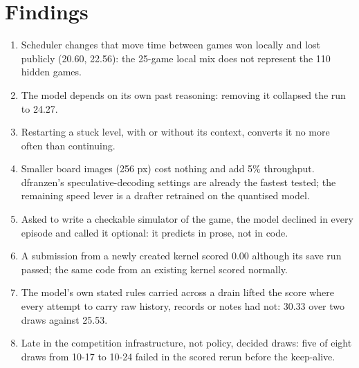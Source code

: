 \documentclass[11pt]{article}
\begin{document}
\section{Findings}
\begin{enumerate}
  \item Scheduler changes that move time between games won locally and lost publicly (20.60, 22.56): the 25-game
        local mix does not represent the 110 hidden games.
  \item The model depends on its own past reasoning: removing it collapsed the run to 24.27.
  \item Restarting a stuck level, with or without its context, converts it no more often than continuing.
  \item Smaller board images (256 px) cost nothing and add 5\% throughput. dfranzen's speculative-decoding settings
        are already the fastest tested; the remaining speed lever is a drafter retrained on the quantised model.
  \item Asked to write a checkable simulator of the game, the model declined in every episode and called it
        optional: it predicts in prose, not in code.
  \item A submission from a newly created kernel scored 0.00 although its save run passed; the same code from an
        existing kernel scored normally.
  \item The model's own stated rules carried across a drain lifted the score where every attempt to carry raw
        history, records or notes had not: 30.33 over two draws against 25.53.
  \item Late in the competition infrastructure, not policy, decided draws: five of eight draws from 10-17 to 10-24 failed
        in the scored rerun before the keep-alive.
\end{enumerate}
\end{document}
